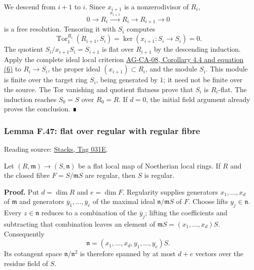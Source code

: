 \documentclass[11pt,a4paper,openany]{report}
\begin{document}
We descend from \(i+1\) to \(i\). Since \(x_{i+1}\) is a nonzerodivisor of \(R_i\), \[
0\longrightarrow R_i\xrightarrow{x_{i+1}}R_i
\longrightarrow R_{i+1}\longrightarrow0
\] is a free resolution. Tensoring it with \(S_i\) computes \[
\operatorname{Tor}_1^{R_i}(R_{i+1},S_i)
=\ker(x_{i+1} : S_i\to S_i)=0.
\] The quotient \(S_i/x_{i+1}S_i=S_{i+1}\) is flat over \(R_{i+1}\) by the descending induction. Apply the complete ideal local criterion \href{https://github.com/KokunoYumeto/open-math-courses/blob/d02d0a3669f42579db037cd44de1d113fdd770a1/docs/courses/AG-CA/src/faithful-flatness-and-the-local-criterion-for-flatness.md}{AG-CA-08, Corollary 4.4 and equation (6)} to \(R_i\to S_i\), the proper ideal \((x_{i+1})\subset R_i\), and the module \(S_i\). This module is finite over the target ring \(S_i\), being generated by \(1\); it need not be finite over the source. The Tor vanishing and quotient flatness prove that \(S_i\) is \(R_i\)-flat. The induction reaches \(S_0=S\) over \(R_0=R\). If \(d=0\), the initial field argument already proves the conclusion. ∎

\label{AG-RG-S05-algebra-lemma-flat-over-regular-with-regular-fibre}

\subsubsection{Lemma F.47: flat over regular with regular fibre}\label{AG-RG-S05-lemma-f.47-flat-over-regular-with-regular-fibre}

Reading source: \href{https://stacks.math.columbia.edu/tag/031E}{Stacks, Tag 031E}.

Let \((R,\mathfrak m)\to(S,\mathfrak n)\) be a flat local map of Noetherian local rings. If \(R\) and the closed fibre \(F=S/\mathfrak mS\) are regular, then \(S\) is regular.

\textbf{Proof.} Put \(d=\dim R\) and \(e=\dim F\). Regularity supplies generators \(x_1,\ldots,x_d\) of \(\mathfrak m\) and generators \(\overline y_1,\ldots,\overline y_e\) of the maximal ideal \(\mathfrak n/\mathfrak mS\) of \(F\). Choose lifts \(y_j\in\mathfrak n\). Every \(z\in\mathfrak n\) reduces to a combination of the \(\overline y_j\); lifting the coefficients and subtracting that combination leaves an element of \(\mathfrak mS=(x_1,\ldots,x_d)S\). Consequently \[
\mathfrak n=(x_1,\ldots,x_d,y_1,\ldots,y_e)S.
\] Its cotangent space \(\mathfrak n/\mathfrak n^2\) is therefore spanned by at most \(d+e\) vectors over the residue field of \(S\).
\end{document}
